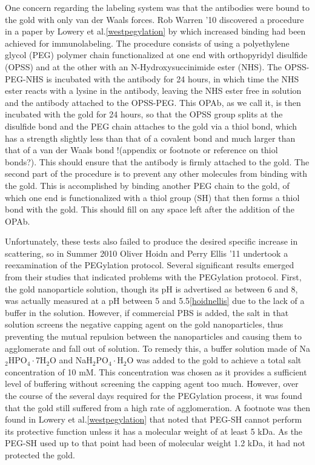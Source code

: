 One concern regarding the labeling system was that the antibodies were bound to the gold with only van der Waals forces. Rob Warren '10 discovered a procedure in a paper by Lowery et al.\autoref{westpegylation} by which increased binding had been achieved for immunolabeling. The procedure consists of using a polyethylene glycol (PEG) polymer chain functionalized at one end with orthopyridyl disulfide (OPSS) and at the other with an N-Hydroxysuccinimide ester (NHS). The OPSS-PEG-NHS is incubated with the antibody for 24 hours, in which time the NHS ester reacts with a lysine in the antibody, leaving the NHS ester free in solution and the antibody attached to the OPSS-PEG. This OPAb, as we call it, is then incubated with the gold for 24 hours, so that the OPSS group splits at the disulfide bond and the PEG chain attaches to the gold via a thiol bond, which has a strength slightly less than that of a covalent bond and much larger than that of a van der Waals bond !(appendix or footnote or reference on thiol bonds?). This should ensure that the antibody is firmly attached to the gold. The second part of the procedure is to prevent any other molecules from binding with the gold. This is accomplished by binding another PEG chain to the gold, of which one end is functionalized with a thiol group (SH) that then forms a thiol bond with the gold. This should fill on any space left after the addition of the OPAb. 

Unfortunately, these tests also failed to produce the desired specific increase in scattering, so in Summer 2010 Oliver Hoidn and Perry Ellis '11 undertook a reexamination of the PEGylation protocol. Several significant results emerged from their studies that indicated problems with the PEGylation protocol. First, the gold nanoparticle solution, though its pH is advertised as between 6 and 8, was actually measured at a pH between 5 and 5.5\autoref{hoidnellis} due to the lack of a buffer in the solution. However, if commercial PBS is added, the salt in that solution screens the negative capping agent on the gold nanoparticles, thus preventing the mutual repulsion between the nanoparticles and causing them to agglomerate and fall out of solution. To remedy this, a buffer solution made of Na$_2$HPO$_4\cdot$7H$_2$O and NaH$_2$PO$_4\cdot$H$_2$O was added to the gold to achieve a total salt concentration of 10 mM. This concentration was chosen as it provides a sufficient level of buffering without screening the capping agent too much. However, over the course of the several days required for the PEGylation process, it was found that the gold still suffered from a high rate of agglomeration. A footnote was then found in Lowery et al.\autoref{westpegylation} that noted that PEG-SH cannot perform its protective function unless it has a molecular weight of at least 5 kDa. As the PEG-SH used up to that point had been of molecular weight 1.2 kDa, it had not protected the gold.

